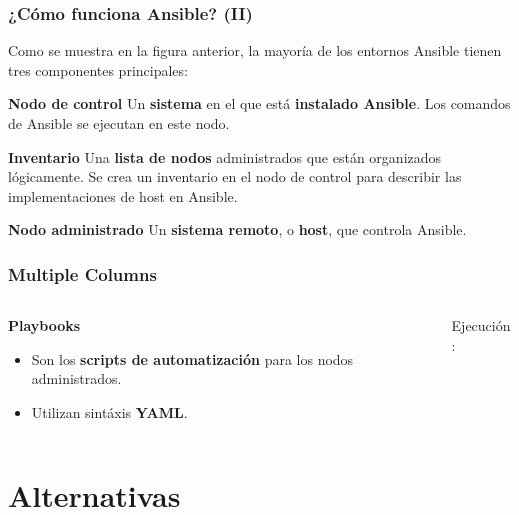 \documentclass[
	11pt, %
]{beamer}
\begin{document}

\begin{frame}
	\frametitle{¿Cómo funciona Ansible? (II)}

	Como se muestra en la figura anterior, la mayoría de los entornos Ansible tienen tres componentes principales:
	
	\begin{block}{\textbf{Nodo de control}}
		Un \textbf{sistema} en el que está \textbf{instalado Ansible}. Los comandos de Ansible se ejecutan en este nodo.
	\end{block}
	
	\begin{exampleblock}{\textbf{Inventario}}
		Una \textbf{lista de nodos} administrados que están organizados lógicamente. Se crea un inventario en el nodo de control para describir las implementaciones de host en Ansible.
	\end{exampleblock}
	
	\begin{alertblock}{\textbf{Nodo administrado}}
		Un \textbf{sistema remoto}, o \textbf{host}, que controla Ansible.
	\end{alertblock}

\end{frame}


\begin{frame}
	\frametitle{Multiple Columns}
	
	\begin{columns}[c]
		\begin{column}{0.45\textwidth}
			\textbf{Playbooks}
			\begin{itemize}
				\item Son los \textbf{scripts de automatización} para los nodos administrados.
				\item Utilizan sintáxis \textbf{YAML}.
			\end{itemize}
		\end{column}
		\begin{column}{0.5\textwidth}
			Ejecución:\\
			
		\end{column}
	\end{columns}
\end{frame}

\section{Alternativas}
\end{document}
